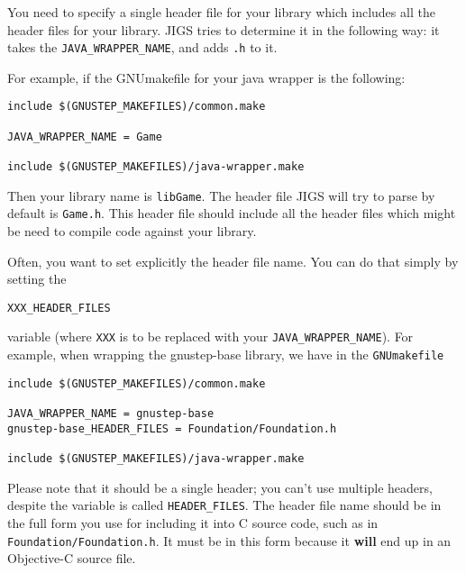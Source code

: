 You need to specify a single header file for your library which
includes all the header files for your library.  JIGS tries to
determine it in the following way: it takes the
\texttt{JAVA\_WRAPPER\_NAME}, and adds \texttt{.h} to it.

For example, if the GNUmakefile for your java wrapper is the following:
\begin{verbatim}
include $(GNUSTEP_MAKEFILES)/common.make

JAVA_WRAPPER_NAME = Game

include $(GNUSTEP_MAKEFILES)/java-wrapper.make
\end{verbatim}
Then your library name is \texttt{libGame}.  The header file JIGS will
try to parse by default is \texttt{Game.h}.  This header file should
include all the header files which might be need to compile code
against your library.

Often, you want to set explicitly the header file name.  You can do
that simply by setting the 
\begin{verbatim}
XXX_HEADER_FILES
\end{verbatim}
variable (where \texttt{XXX} is to be replaced with your
\texttt{JAVA\_WRAPPER\_NAME}).  For example, when wrapping the
gnustep-base library, we have in the \texttt{GNUmakefile}
\begin{verbatim}
include $(GNUSTEP_MAKEFILES)/common.make

JAVA_WRAPPER_NAME = gnustep-base
gnustep-base_HEADER_FILES = Foundation/Foundation.h

include $(GNUSTEP_MAKEFILES)/java-wrapper.make
\end{verbatim}
Please note that it should be a single header; you can't use multiple
headers, despite the variable is called \texttt{HEADER\_FILES}.  The
header file name should be in the full form you use for including it
into C source code, such as in \texttt{Foundation/Foundation.h}.  It
must be in this form because it {\bf will} end up in an Objective-C
source file.

